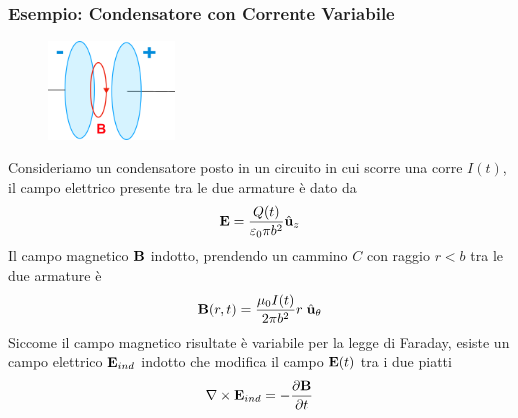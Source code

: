 \subsubsection{Esempio: Condensatore con Corrente Variabile}
\begin{figure}
    \centering
    \includegraphics[width=0.3\textwidth]{images/parallel_plate3} %
\end{figure}
Consideriamo un condensatore posto in un circuito in cui scorre una corre $I(t)$, il campo elettrico presente tra le due armature \`e dato da 
\begin{equation*}
	\bold{E} = \frac{Q(t)}{\varepsilon_0 \pi b^2}\hat{\bold{u}}_z
\end{equation*}
Il campo magnetico $\bold{B}$ indotto, prendendo un cammino $C$ con raggio $r<b$ tra le due armature \`e 
\begin{equation*}
	\bold{B}(r,t) = \frac{\mu_0 I(t)}{2 \pi b^2}r \;\hat{\bold{u}}_{\theta}
\end{equation*}
Siccome il campo magnetico risultate \`e variabile per la legge di Faraday, esiste un campo elettrico $\bold{E}_{ind}$ indotto che modifica il campo $\bold{E}(t)$ tra i due piatti
\begin{equation*}
	\nabla \times \bold{E}_{ind} = - \frac{\partial \bold{B}}{\partial t}
\end{equation*}


